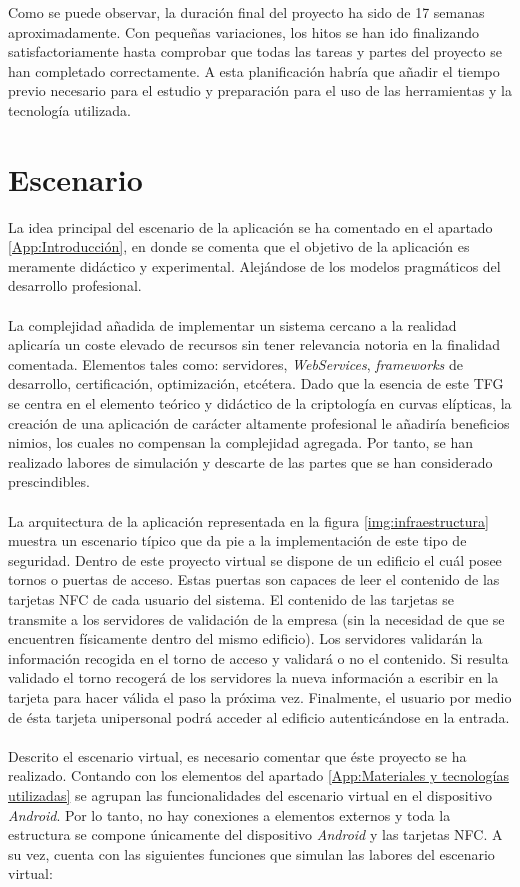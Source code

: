 \documentclass[../PFC.tex]{subfiles}
\begin{document}
Como se puede observar, la duración final del proyecto ha sido de 17 semanas aproximadamente. Con pequeñas variaciones, los hitos se han ido finalizando satisfactoriamente hasta comprobar que todas las tareas y partes del proyecto se han completado correctamente. A esta planificación habría que añadir el tiempo previo necesario para el estudio y preparación para el uso de las herramientas y la tecnología utilizada.

\section{Escenario}
\label{App:Escenario}

La idea principal del escenario de la aplicación se ha comentado en el apartado \ref{App:Introducción}, en donde se comenta que el objetivo de la aplicación es meramente didáctico y experimental. Alejándose de los modelos pragmáticos del desarrollo profesional. 
\\\\
La complejidad añadida de implementar un sistema cercano a la realidad aplicaría un coste elevado de recursos sin tener relevancia notoria en la finalidad comentada. Elementos tales como: servidores, \textit{WebServices}, \textit{frameworks} de desarrollo, certificación, optimización, etcétera. Dado que la esencia de este TFG se centra en el elemento teórico y didáctico de la criptología en curvas elípticas, la creación de una aplicación de carácter altamente profesional le añadiría beneficios nimios, los cuales no compensan la complejidad agregada. Por tanto, se han realizado labores de simulación y descarte de las partes que se han considerado prescindibles.
\\\\
La arquitectura de la aplicación representada en la figura \ref{img:infraestructura} muestra un escenario típico que da pie a la implementación de este tipo de seguridad. Dentro de este proyecto virtual se dispone de un edificio el cuál posee tornos o puertas de acceso. Estas puertas son capaces de leer el contenido de las tarjetas NFC de cada usuario del sistema. El contenido de las tarjetas se transmite a los servidores de validación de la empresa (sin la necesidad de que se encuentren físicamente dentro del mismo edificio). Los servidores validarán la información recogida en el torno de acceso y validará o no el contenido. Si resulta validado el torno recogerá de los servidores la nueva información a escribir en la tarjeta para hacer válida el paso la próxima vez. Finalmente, el usuario por medio de ésta tarjeta unipersonal podrá acceder al edificio autenticándose en la entrada.
\\\\
Descrito el escenario virtual, es necesario comentar que éste proyecto se ha realizado. Contando con los elementos del apartado \ref{App:Materiales y tecnologías utilizadas} se agrupan las funcionalidades del escenario virtual en el dispositivo \textit{Android}. Por lo tanto, no hay conexiones a elementos externos y toda la estructura se compone únicamente del dispositivo \textit{Android} y las tarjetas NFC. A su vez, cuenta con las siguientes funciones que simulan las labores del escenario virtual:
\end{document}
